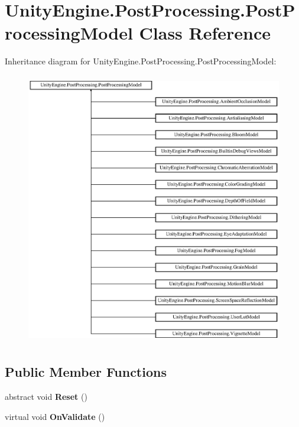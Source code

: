 \hypertarget{class_unity_engine_1_1_post_processing_1_1_post_processing_model}{}\section{Unity\+Engine.\+Post\+Processing.\+Post\+Processing\+Model Class Reference}
\label{class_unity_engine_1_1_post_processing_1_1_post_processing_model}
Inheritance diagram for Unity\+Engine.\+Post\+Processing.\+Post\+Processing\+Model\+:\begin{figure}[H]
\begin{center}
\leavevmode
\includegraphics[height=12.000000cm]{class_unity_engine_1_1_post_processing_1_1_post_processing_model}
\end{center}
\end{figure}
\subsection*{Public Member Functions}
\begin{DoxyCompactItemize}
\item 
\mbox{\label{class_unity_engine_1_1_post_processing_1_1_post_processing_model_a15213e159193dba066f066b74b4e968d}} 
abstract void {\bfseries Reset} ()
\item 
\mbox{\label{class_unity_engine_1_1_post_processing_1_1_post_processing_model_acd362b51fa5958140754a1a4bdc1d768}} 
virtual void {\bfseries On\+Validate} ()
\end{DoxyCompactItemize}
